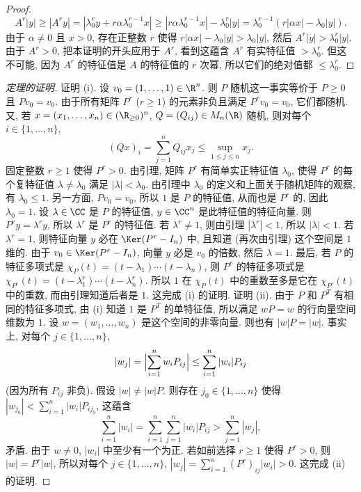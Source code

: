 \begin{proof}
\[
A^r|y| \geq |A^ry| = |\lambda_0^ry + r\alpha\lambda_0^{r-1}x| \geq |r\alpha\lambda_0^{r-1}x| - \lambda_0^r|y| = \lambda_0^{r-1}(r|\alpha x| - \lambda_0|y|).
\]
由于 $\alpha \neq 0$ 且 $x > 0$, 存在正整数 $r$ 使得 $r|\alpha x| - \lambda_0|y| > \lambda_0|y|$, 然后 $A^r|y| > \lambda_0^r|y|$. 由于 $A^r > 0$, 把本证明的开头应用于 $A^r$, 看到这蕴含 $A^r$ 有实特征值 $> \lambda_0^r$. 但这不可能, 因为 $A^r$ 的特征值是 $A$ 的特征值的 $r$ 次幂, 所以它们的绝对值都 $\leq \lambda_0^r$.
\end{proof}

\begin{proof}[定理的证明]
证明 (i). 设 $v_0 = (1, \ldots, 1) \in \R^n$. 则 $P$ 随机这一事实等价于 $P \geq 0$ 且 $Pv_0 = v_0$. 由于所有矩阵 $P^r$ ($r \geq 1$) 的元素非负且满足 $P^rv_0 = v_0$, 它们都随机. 又, 若 $x = (x_1, \ldots, x_n) \in (\R_{\geq 0})^n$, $Q = (Q_{ij}) \in M_n(\R)$ 随机, 则对每个 $i \in \{1, \ldots, n\}$,
\[
(Qx)_i = \sum_{j=1}^n Q_{ij}x_j \leq \sup_{1 \leq j \leq n}x_j.
\]
固定整数 $r \geq 1$ 使得 $P^r > 0$. 由引理, 矩阵 $P^r$ 有简单实正特征值 $\lambda_0$, 使得 $P^r$ 的每个复特征值 $\lambda \neq \lambda_0$ 满足 $|\lambda| < \lambda_0$. 由引理中 $\lambda_0$ 的定义和上面关于随机矩阵的观察, 有 $\lambda_0 \leq 1$. 另一方面, $Pv_0 = v_0$, 所以 $1$ 是 $P$ 的特征值, 从而也是 $P^r$ 的, 因此 $\lambda_0 = 1$. 设 $\lambda \in \CC$ 是 $P$ 的特征值, $y \in \CC^n$ 是此特征值的特征向量. 则 $P^ry = \lambda^ry$, 所以 $\lambda^r$ 是 $P^r$ 的特征值. 若 $\lambda^r \neq 1$, 则由引理 $|\lambda^r| < 1$, 所以 $|\lambda| < 1$. 若 $\lambda^r = 1$, 则特征向量 $y$ 必在 $\Ker(P^r - I_n)$ 中, 且知道 (再次由引理) 这个空间是 $1$ 维的. 由于 $v_0 \in \Ker(P^r - I_n)$, 向量 $y$ 必是 $v_0$ 的倍数, 然后 $\lambda = 1$.
最后, 若 $P$ 的特征多项式是 $\chi_P(t) = (t - \lambda_1)\cdots(t - \lambda_n)$, 则 $P^r$ 的特征多项式是 $\chi_{P^r}(t) = (t - \lambda_1^r)\cdots(t - \lambda_n^r)$. 所以 $1$ 在 $\chi_P(t)$ 中的重数至多是它在 $\chi_{P^r}(t)$ 中的重数, 而由引理知道后者是 $1$. 这完成 (i) 的证明.
证明 (ii). 由于 $P$ 和 $P^T$ 有相同的特征多项式, 由 (i) 知道 $1$ 是 $P^T$ 的单特征值, 所以满足 $wP = w$ 的行向量空间维数为 $1$. 设 $w = (w_1, \ldots, w_n)$ 是这个空间的非零向量. 则也有 $|w|P = |w|$. 事实上, 对每个 $j \in \{1, \ldots, n\}$,
\[
|w_j| = \Bigl|\sum_{i=1}^n w_iP_{ij}\Bigr| \leq \sum_{i=1}^n |w_i|P_{ij}
\]
(因为所有 $P_{ij}$ 非负). 假设 $|w| \neq |w|P$. 则存在 $j_0 \in \{1, \ldots, n\}$ 使得 $|w_{j_0}| < \sum_{i=1}^n |w_i|P_{ij_0}$, 这蕴含
\[
\sum_{i=1}^n |w_i| = \sum_{i=1}^n\sum_{j=1}^n |w_i|P_{ij} > \sum_{j=1}^n |w_j|,
\]
矛盾. 由于 $w \neq 0$, $|w_i|$ 中至少有一个为正. 若如前选择 $r \geq 1$ 使得 $P^r > 0$, 则 $|w| = P^r|w|$, 所以对每个 $j \in \{1, \ldots, n\}$, $|w_j| = \sum_{i=1}^n (P^r)_{ij}|w_i| > 0$. 这完成 (ii) 的证明.

\end{proof}
